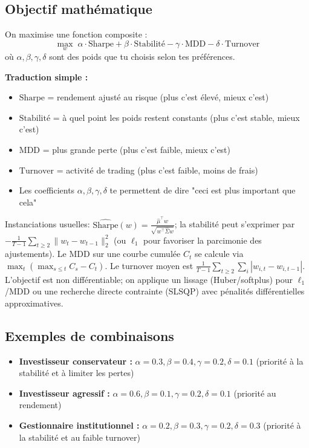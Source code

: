 \documentclass[11pt,a4paper]{article}
\begin{document}
\subsection{Objectif mathématique}
On maximise une fonction composite :
\[\max_w \; \alpha \cdot \text{Sharpe} + \beta \cdot \text{Stabilité} - \gamma \cdot \text{MDD} - \delta \cdot \text{Turnover}\]
où \(\alpha, \beta, \gamma, \delta\) sont des poids que tu choisis selon tes préférences.

\textbf{Traduction simple :} 
\begin{itemize}
\item \(\text{Sharpe}\) = rendement ajusté au risque (plus c'est élevé, mieux c'est)
\item \(\text{Stabilité}\) = à quel point les poids restent constants (plus c'est stable, mieux c'est)
\item \(\text{MDD}\) = plus grande perte (plus c'est faible, mieux c'est)
\item \(\text{Turnover}\) = activité de trading (plus c'est faible, moins de frais)
\item Les coefficients \(\alpha, \beta, \gamma, \delta\) te permettent de dire "ceci est plus important que cela"
\end{itemize}
\noindent Instanciations usuelles: \(\widehat{\text{Sharpe}}(w)=\frac{\hat\mu^\top w}{\sqrt{w^\top \hat\Sigma w}}\); la stabilité peut s'exprimer par \(-\frac{1}{T-1}\sum_{t\ge 2}\lVert w_t-w_{t-1}\rVert_2^2\) (ou \(\ell_1\) pour favoriser la parcimonie des ajustements). Le \(\text{MDD}\) sur une courbe cumulée \(C_t\) se calcule via \(\max_t (\max_{s\le t} C_s - C_t)\). Le turnover moyen est \(\frac{1}{T-1}\sum_{t\ge 2}\sum_i |w_{i,t}-w_{i,t-1}|\). L'objectif est non différentiable; on applique un lissage (Huber/softplus) pour \(\ell_1\)/MDD ou une recherche directe contrainte (SLSQP) avec pénalités différentielles approximatives.

\subsection{Exemples de combinaisons}
\begin{itemize}
\item \textbf{Investisseur conservateur :} \(\alpha=0.3, \beta=0.4, \gamma=0.2, \delta=0.1\) (priorité à la stabilité et à limiter les pertes)
\item \textbf{Investisseur agressif :} \(\alpha=0.6, \beta=0.1, \gamma=0.2, \delta=0.1\) (priorité au rendement)
\item \textbf{Gestionnaire institutionnel :} \(\alpha=0.2, \beta=0.3, \gamma=0.2, \delta=0.3\) (priorité à la stabilité et au faible turnover)
\end{itemize}
\end{document}

